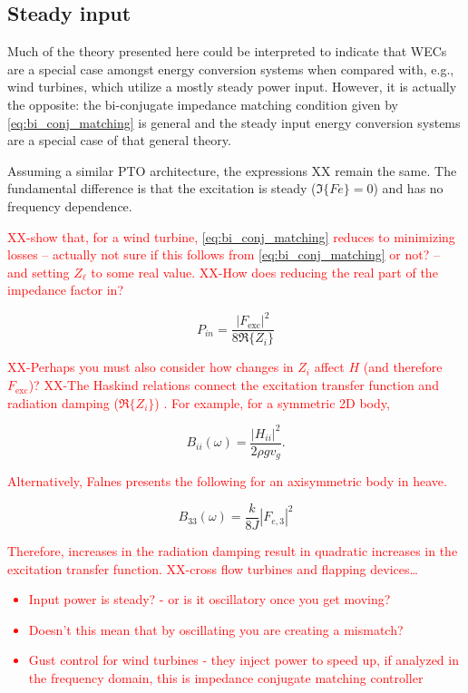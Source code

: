 \documentclass[lettersize,journal]{IEEEtran}
\newcommand{\rc}[1]{\textcolor{red}{#1}}
\begin{document}
\subsection{Steady input}\label{sec:steady_input}
Much of the theory presented here could be interpreted to indicate that WECs are a special case amongst energy conversion systems when compared with, e.g., wind turbines, which utilize a mostly steady power input.
However, it is actually the opposite: the bi-conjugate impedance matching condition given by \eqref{eq:bi_conj_matching} is general and the steady input energy conversion systems are a special case of that general theory.

Assuming a similar PTO architecture, the expressions XX remain the same.
The fundamental difference is that the excitation is steady ($\Im \{ Fe \} = 0$) and has no frequency dependence.

\rc{
XX-show that, for a wind turbine, \eqref{eq:bi_conj_matching} reduces to minimizing losses -- actually not sure if this follows from \eqref{eq:bi_conj_matching} or not? -- and setting $Z_\ell$ to some real value.
XX-How does reducing the real part of the impedance factor in?}

\begin{equation}
        P_{in} = \frac{ | F_{\textrm{exc}} |^2 }{8 \Re \{ Z_i \}}
\end{equation}

\rc{XX-Perhaps you must also consider how changes in $Z_i$ affect $H$ (and therefore $F_{\textrm{exc}}$)?
XX-The Haskind relations connect the excitation transfer function and radiation damping ($\Re \{ Z_i \}$) \cite[pg. 304]{Newman:1978aa}.
For example, for a symmetric 2D body,}

\begin{equation}
        B_{ii}(\omega) = \frac{| H_{ii} |^2}{2 \rho g v_g} .
\end{equation}

\rc{
\noindent{}Alternatively, Falnes presents \cite[pg. 149]{Falnes:2002aa} the following for an axisymmetric body in heave.}

\begin{equation}
        B_{33}(\omega) = \frac{k}{8J} | F_{e,3} |^2
\end{equation}

\rc{
\noindent{}Therefore, increases in the radiation damping result in quadratic increases in the excitation transfer function.
XX-cross flow turbines and flapping devices\dots{}
\begin{itemize}
        \item Input power is steady? - or is it oscillatory once you get moving?
        \item Doesn't this mean that by oscillating you are creating a mismatch?
        \item Gust control for wind turbines - they inject power to speed up, if analyzed in the frequency domain, this is impedance conjugate matching controller
\end{itemize}}
\end{document}
